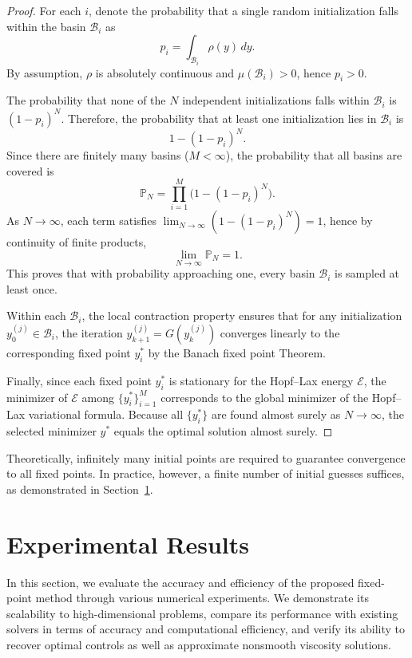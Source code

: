 \documentclass[review,hidelinks,onefignum,onetabnum]{siamart250106}
\begin{document}
\begin{proof}
For each $i$, denote the probability that a single random initialization 
falls within the basin $\mathcal{B}_i$ as 
\[
    p_i = \int_{\mathcal{B}_i} \rho(y) \, dy.
\]
By assumption, $\rho$ is absolutely continuous and $\mu(\mathcal{B}_i) > 0$, 
hence $p_i > 0$.

The probability that none of the $N$ independent initializations falls within $\mathcal{B}_i$ is $(1-p_i)^N$. 
Therefore, the probability that at least one initialization lies in $\mathcal{B}_i$ is
\[
    1 - (1-p_i)^N.
\]
Since there are finitely many basins ($M<\infty$), the probability that all basins are covered is
\[
    \mathbb{P}_N = \prod_{i=1}^M \big( 1 - (1-p_i)^N \big).
\]
As $N \to \infty$, each term satisfies $\lim_{N\to\infty} (1 - (1-p_i)^N) = 1$, 
hence by continuity of finite products,
\[
    \lim_{N\to\infty} \mathbb{P}_N = 1.
\]
This proves that with probability approaching one, every basin $\mathcal{B}_i$ is sampled at least once.

Within each $\mathcal{B}_i$, the local contraction property ensures that 
for any initialization $y_0^{(j)} \in \mathcal{B}_i$, 
the iteration $y_{k+1}^{(j)} = G(y_k^{(j)})$ converges linearly to the corresponding 
fixed point $y_i^*$ by the Banach fixed point Theorem.

Finally, since each fixed point $y_i^*$ is stationary for the Hopf--Lax energy $\mathcal{E}$, 
the minimizer of $\mathcal{E}$ among $\{y_i^*\}_{i=1}^M$ corresponds to the global minimizer of the Hopf--Lax variational formula. 
Because all $\{y_i^*\}$ are found almost surely as $N\to\infty$, 
the selected minimizer $y^*$ equals the optimal solution almost surely.
\end{proof}

Theoretically, infinitely many initial points are required to guarantee convergence to all fixed points. In practice, however, a finite number of initial guesses suffices, as demonstrated in Section~\ref{sec:experiments}.

\section{Experimental Results}\label{sec:experiments}
In this section, we evaluate the accuracy and efficiency of the proposed fixed-point method through various numerical experiments. 
We demonstrate its scalability to high-dimensional problems, compare its performance with existing solvers in terms of accuracy and computational efficiency, and verify its ability to recover optimal controls as well as approximate nonsmooth viscosity solutions.
\end{document}
